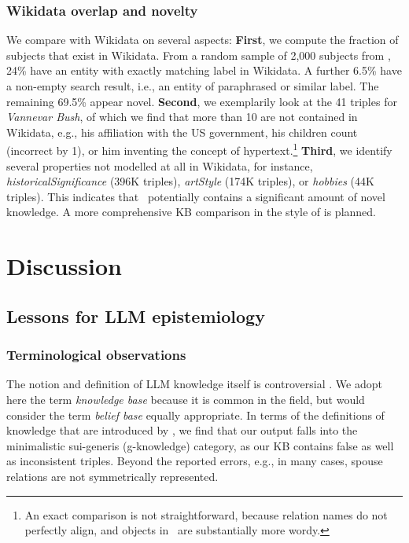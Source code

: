 \subsection{Wikidata overlap and novelty}
We compare with Wikidata on several aspects: \textbf{First}, we compute the fraction of subjects that exist in Wikidata. From a random sample of 2,000 subjects from \ourkb, 24\% have an entity with exactly matching label in Wikidata. A further 6.5\% have a non-empty search result, i.e., an entity of paraphrased or similar label. The remaining 69.5\% appear novel.  %
\textbf{Second}, we exemplarily look at the 41 triples for \textit{Vannevar Bush}, of which we find that more than 10 are not contained in Wikidata, e.g., his affiliation with the US government, his children count (incorrect by 1), or him inventing the concept of hypertext.\footnote{An exact comparison is not straightforward, because relation names do not perfectly align, and objects in \ourkb\ are substantially more wordy.} \textbf{Third}, we identify several properties not modelled at all in Wikidata, for instance, \textit{historicalSignificance} (396K triples), \textit{artStyle} (174K triples), or \textit{hobbies} (44K triples). 
This indicates that \ourkb\ potentially contains a significant amount of novel knowledge. A more comprehensive KB comparison in the style of \cite{farber2018linked} is planned.





\chapter{Discussion}

\section{Lessons for LLM epistemiology}
\label{epistemiology}

\subsection{Terminological observations}
The notion and definition of LLM knowledge itself is controversial \cite{fierro2024defining}. We adopt here the term \textit{knowledge base} because it is common in the field, but would consider the term \textit{belief base} equally appropriate. In terms of the definitions of knowledge that are introduced by \citet{fierro2024defining}, we find that our output falls into the minimalistic sui-generis (g-knowledge) category, as our KB contains false as well as inconsistent triples. Beyond the reported errors, e.g., in many cases, spouse relations are not symmetrically represented. 


